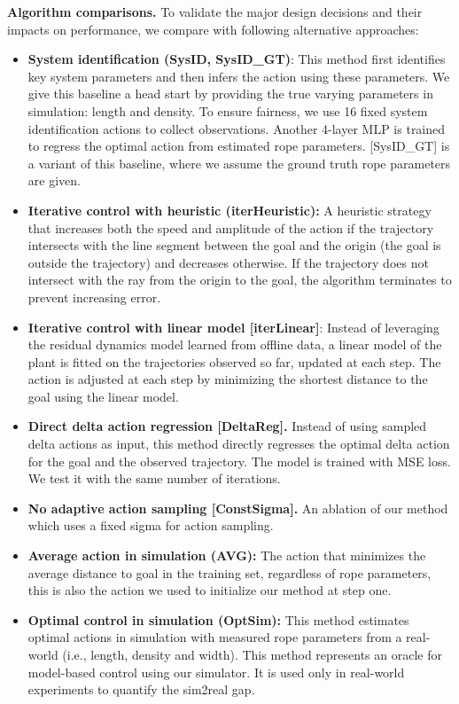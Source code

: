 \textbf{Algorithm comparisons.} 
To validate the major design decisions and their impacts on performance, we compare with following alternative approaches: 
\begin{itemize}[leftmargin=3mm]
    \item \textbf{System identification (SysID, SysID\_GT)}:  This method first identifies key system parameters and then infers the action using these parameters. We give this baseline a head start by providing the true varying parameters in simulation: length and density. To ensure fairness, we use 16 fixed system identification actions to collect observations. Another 4-layer MLP is trained to regress the optimal action from estimated rope parameters. [SysID\_GT] is a variant of this baseline, where we assume the ground truth rope parameters are given.
    
    \item \textbf{Iterative control with heuristic (iterHeuristic):} A heuristic strategy that increases both the speed and amplitude of the action if the trajectory intersects with the line segment between the goal and the origin (the goal is outside the trajectory) and decreases otherwise. If the trajectory does not intersect with the ray from the origin to the goal, the algorithm terminates to prevent increasing error.
    
    \item \textbf{Iterative control with linear model [iterLinear]}: 
    Instead of leveraging the residual dynamics model learned from offline data, a linear model of the plant is fitted on the trajectories observed so far, updated at each step. The action is adjusted at each step by minimizing the shortest distance to the goal using the linear model.
    
    \item \textbf{Direct delta action regression [DeltaReg].} Instead of using sampled delta actions as input, this method directly regresses the optimal delta action for the goal and the observed trajectory. The model is trained with MSE loss.  We test it with the same number of iterations.
    
    \item \textbf{No adaptive action sampling [ConstSigma].} An ablation of our method which uses a fixed sigma for action sampling.
    
    \item \textbf{Average action in simulation (AVG):} The action that minimizes the average distance to goal in the training set, regardless of rope parameters, this is also the action we used to initialize our method at step one. 
    
    \item \textbf{Optimal control in simulation (OptSim):} This method estimates optimal actions in simulation with measured rope parameters from a real-world (i.e., length, density and width). This method represents an oracle for model-based control using our simulator. It is used only in real-world experiments to quantify the sim2real gap.
\end{itemize}

